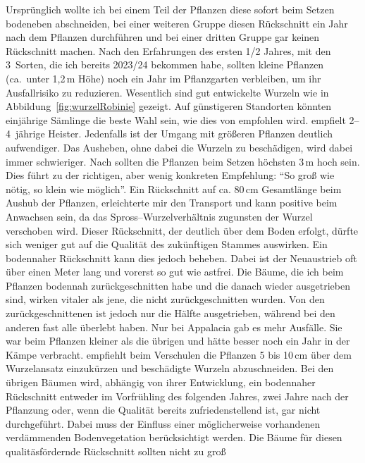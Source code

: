 \documentclass[twocolumn]{scrartcl}
\begin{document}
Ursprünglich wollte ich bei einem Teil der Pflanzen diese sofort beim
Setzen bodeneben abschneiden, bei einer weiteren Gruppe diesen
Rückschnitt ein Jahr nach dem Pflanzen durchführen und bei einer
dritten Gruppe gar keinen Rückschnitt machen. Nach den Erfahrungen des
ersten 1/2 Jahres, mit den 3~Sorten, die ich bereits 2023/24 bekommen
habe, sollten kleine Pflanzen (ca.\ unter 1,2\,m Höhe) noch ein Jahr
im Pflanzgarten verbleiben, um ihr Ausfallrisiko zu
reduzieren. Wesentlich sind gut entwickelte Wurzeln wie in
Abbildung~\ref{fig:wurzelRobinie} gezeigt. Auf günstigeren Standorten
könnten einjährige Sämlinge die beste Wahl sein, wie dies von
\citet{ciuvat2022robinieRumaenien} empfohlen wird.
\citet[S.~51]{fekete1931robinieErtragstafel} empfielt 2--4~jährige Heister.
Jedenfalls ist
der Umgang mit größeren Pflanzen deutlich aufwendiger.  Das Ausheben,
ohne dabei die Wurzeln zu beschädigen, wird dabei immer schwieriger.
Nach \citet{fuehrer2005robinie} sollten die Pflanzen beim Setzen
höchsten 3\,m hoch sein.
Dies führt zu der richtigen, aber wenig konkreten Empfehlung:
\enquote{So groß wie nötig, so klein wie möglich}. Ein Rückschnitt
auf ca. 80\,cm Gesamtlänge beim Aushub der Pflanzen, erleichterte mir
den Transport und kann positive beim Anwachsen sein, da das
Spross--Wurzelverhältnis zugunsten der Wurzel verschoben wird.  Dieser
Rückschnitt, der deutlich über dem Boden erfolgt, dürfte sich weniger
gut auf die Qualität des zukünftigen Stammes auswirken.  Ein
bodennaher Rückschnitt kann dies jedoch beheben. Dabei ist der
Neuaustrieb oft über einen Meter lang und vorerst so gut wie astfrei.
Die Bäume, die ich beim Pflanzen bodennah zurückgeschnitten habe und
die danach wieder ausgetrieben sind, wirken vitaler als jene, die
nicht zurückgeschnitten wurden. Von den zurückgeschnittenen ist jedoch
nur die Hälfte ausgetrieben, während bei den anderen fast alle
überlebt haben. Nur bei Appalacia gab es mehr Ausfälle. Sie war beim
Pflanzen kleiner als die übrigen und hätte besser noch ein Jahr in der
Kämpe verbracht.
\citet{bund1899robinie} empfiehlt beim Verschulen die Pflanzen 5 bis 10\,cm
über dem Wurzelansatz einzukürzen und beschädigte Wurzeln abzuschneiden.
Bei den übrigen Bäumen wird, abhängig von ihrer Entwicklung, ein
bodennaher Rückschnitt entweder im Vorfrühling des folgenden Jahres,
zwei Jahre nach der Pflanzung oder, wenn die Qualität bereits
zufriedenstellend ist, gar nicht durchgeführt.
Dabei muss der Einfluss einer möglicherweise
vorhandenen verdämmenden Bodenvegetation berücksichtigt werden. Die
Bäume für diesen qualitäsfördernde Rückschnitt sollten nicht zu groß
\end{document}
